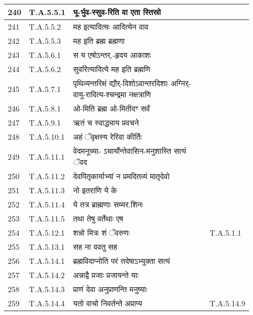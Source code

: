 \documentclass[17pt]{extarticle}
\begin{document}
\begin{longtable}{||p{0.4in}||p{0.9in}||p{4.0in}||p{0.9in}||}
        \hline
            240 & T.A.5.5.1 & भू{-}र्भुव{-}स्सुव{-}रिति वा एता स्तिस्रो &      \\
        \hline
            241 & T.A.5.5.2 & मह इत्यादित्यः आदित्येन वाव &      \\
        \hline
            242 & T.A.5.5.3 & मह इति ब्रह्म ब्रह्मणा &      \\
        \hline
            243 & T.A.5.6.1 & स य एषोऽन्तर्.{-}हृदय आकाशः &      \\
        \hline
            244 & T.A.5.6.2 & सुवरित्यादित्ये मह इति ब्रह्मणि &      \\
        \hline
            245 & T.A.5.7.1 & पृथिव्यन्तरिक्षं द्यौर्{-}दिशोऽवान्तरदिशाः अग्निर्{-}वायु{-}रादित्य{-}श्चन्द्रमा नक्षत्राणि &      \\
        \hline
            246 & T.A.5.8.1 & ओ{-}मिति ब्रह्म ओ{-}मितीदꣳ सर्वं &      \\
        \hline
            247 & T.A.5.9.1 & ऋतं च स्वाद्ध्याय प्रवचने &      \\
        \hline
            248 & T.A.5.10.1 & अहं ॅवृक्षस्य रेरिवा कीर्तिः &      \\
        \hline
            249 & T.A.5.11.1 & वेदमनूच्या{-} ऽचार्योन्तेवासिन{-}मनुशास्ति सत्यं ॅवद &      \\
        \hline
            250 & T.A.5.11.2 & देवपितृकार्याभ्यां न प्रमदितव्यं मातृदेवो &      \\
        \hline
            251 & T.A.5.11.3 & नो इतराणि ये के &      \\
        \hline
            252 & T.A.5.11.4 & ये तत्र ब्राह्मणाः सम्मर.शिनः &      \\
        \hline
            253 & T.A.5.11.5 & तथा तेषु वर्तेथाः एष &      \\
        \hline
            254 & T.A.5.12.1 & शन्नो मित्रः शं ॅवरुणः & T.A.5.1.1        \\
        \hline
            255 & T.A.5.13.1 & सह ना ववतु सह &      \\
        \hline
            256 & T.A.5.14.1 & ब्रह्मविदाप्नोति परं तदेषाऽभ्युक्ता सत्यं &      \\
        \hline
            257 & T.A.5.14.2 & अन्नाद्वै प्रजाः प्रजायन्ते याः &      \\
        \hline
            258 & T.A.5.14.3 & प्राणं देवा अनुप्राणन्ति मनुष्याः &      \\
        \hline
            259 & T.A.5.14.4 & यतो वाचो निवर्तन्ते अप्राप्य &  T.A.5.14.9       \\

\end{longtable}
\end{document}
